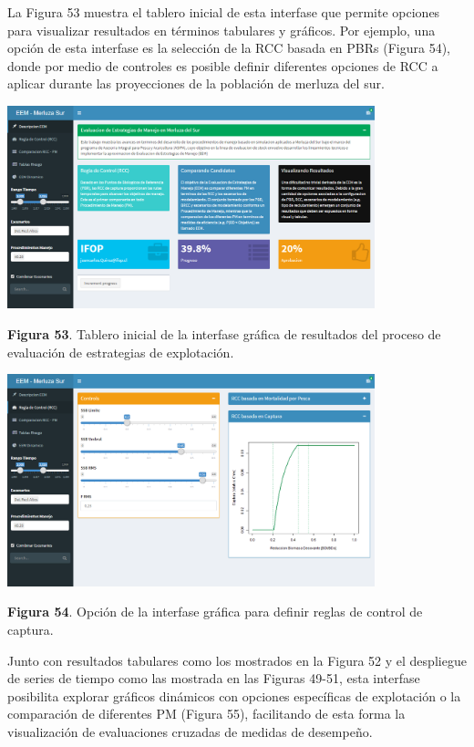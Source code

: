 \documentclass[
  spanish,
]{article}
\begin{document}
La Figura 53 muestra el tablero inicial de esta interfase que permite
opciones para visualizar resultados en términos tabulares y gráficos.
Por ejemplo, una opción de esta interfase es la selección de la RCC
basada en PBRs (Figura 54), donde por medio de controles es posible
definir diferentes opciones de RCC a aplicar durante las proyecciones de
la población de merluza del sur.

\begin{center}
\includegraphics[width=0.8\textwidth]{Figuras/Figura_53.png}
\end{center}

\small \textbf{Figura 53}. Tablero inicial de la interfase gráfica de
resultados del proceso de evaluación de estrategias de explotación.
\vspace{0.5cm} \normalsize

\begin{center}
\includegraphics[width=0.8\textwidth]{Figuras/Figura_54.png}
\end{center}

\small \textbf{Figura 54}. Opción de la interfase gráfica para definir
reglas de control de captura. \vspace{0.5cm} \normalsize

Junto con resultados tabulares como los mostrados en la Figura 52 y el
despliegue de series de tiempo como las mostrada en las Figuras 49-51,
esta interfase posibilita explorar gráficos dinámicos con opciones
específicas de explotación o la comparación de diferentes PM (Figura
55), facilitando de esta forma la visualización de evaluaciones cruzadas
de medidas de desempeño.
\end{document}
